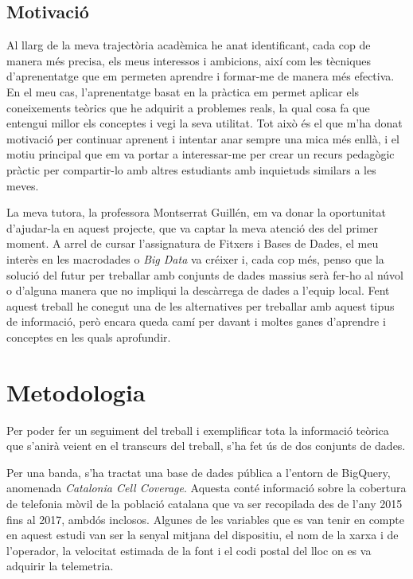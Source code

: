 \documentclass[12pt,longbibliography]{article}
\theoremstyle{definition}
\theoremstyle{remark}
\begin{document}
\subsection{Motivació}

Al llarg de la meva trajectòria acadèmica he anat identificant, cada cop de manera més precisa, els meus interessos i ambicions, així com les tècniques d'aprenentatge que em permeten aprendre i formar-me de manera més efectiva. En el meu cas, l'aprenentatge basat en la pràctica em permet aplicar els coneixements teòrics que he adquirit a problemes reals, la qual cosa fa que entengui millor els conceptes i vegi la seva utilitat. Tot això és el que m’ha donat motivació per continuar aprenent i intentar anar sempre una mica més enllà, i el motiu principal que em va portar a interessar-me per crear un recurs pedagògic pràctic per compartir-lo amb altres estudiants amb inquietuds similars a les meves.

La meva tutora, la professora Montserrat Guillén, em va donar la oportunitat d'ajudar-la en aquest projecte, que va captar la meva atenció des del primer moment. A arrel de cursar l'assignatura de Fitxers i Bases de Dades, el meu interès en les macrodades o \textit{Big Data} va créixer i, cada cop més, penso que la solució del futur per treballar amb conjunts de dades massius serà fer-ho al núvol o d'alguna manera que no impliqui la descàrrega de dades a l'equip local. Fent aquest treball he conegut una de les alternatives per treballar amb aquest tipus de informació, però encara queda camí per davant i moltes ganes d'aprendre i conceptes en les quals aprofundir.

\section{Metodologia}

Per poder fer un seguiment del treball i exemplificar tota la informació teòrica que s'anirà veient en el transcurs del treball, s'ha fet ús de dos conjunts de dades. 

Per una banda, s'ha tractat una base de dades pública a l'entorn de BigQuery, anomenada \textit{Catalonia Cell Coverage}. Aquesta conté informació sobre la cobertura de telefonia mòvil de la població catalana que va ser recopilada des de l'any 2015 fins al 2017, ambdós inclosos. Algunes de les variables que es van tenir en compte en aquest estudi van ser la senyal mitjana del dispositiu, el nom de la xarxa i de l'operador, la velocitat estimada de la font i el codi postal del lloc on es va adquirir la telemetria.
\end{document}
